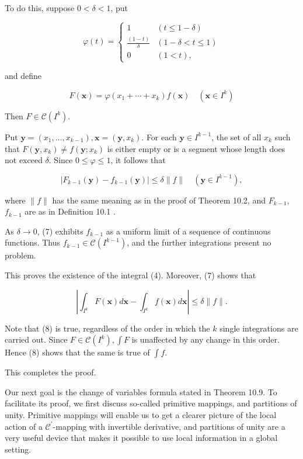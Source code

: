 \documentclass[10pt]{article}
\begin{document}
To do this, suppose $0<\delta<1$, put

$$
\varphi(t)= \begin{cases}1 & (t \leq 1-\delta) \\ \frac{(1-t)}{\delta} & (1-\delta<t \leq 1) \\ 0 & (1<t),\end{cases}
$$

and define

$$
F(\mathbf{x})=\varphi\left(x_{1}+\cdots+x_{k}\right) f(\mathbf{x}) \quad\left(\mathbf{x} \in I^{k}\right)
$$

Then $F \in \mathscr{C}\left(I^{k}\right)$.

Put $\mathbf{y}=\left(x_{1}, \ldots, x_{k-1}\right), \mathbf{x}=\left(\mathbf{y}, x_{k}\right)$. For each $\mathbf{y} \in I^{k-1}$, the set of all $x_{k}$ such that $F\left(\mathbf{y}, x_{k}\right) \neq f\left(\mathbf{y} ; x_{k}\right)$ is either empty or is a segment whose length does not exceed $\delta$. Since $0 \leq \varphi \leq 1$, it follows that

$$
\left|F_{k-1}(\mathbf{y})-f_{k-1}(\mathbf{y})\right| \leq \delta\|f\| \quad\left(\mathbf{y} \in I^{k-1}\right),
$$

where $\|f\|$ has the same meaning as in the proof of Theorem 10.2, and $F_{k-1}$, $f_{k-1}$ are as in Definition 10.1 .

As $\delta \rightarrow 0$, (7) exhibits $f_{k-1}$ as a uniform limit of a sequence of continuous functions. Thus $f_{k-1} \in \mathscr{C}\left(I^{k-1}\right)$, and the further integrations present no problem.

This proves the existence of the integral (4). Moreover, (7) shows that

$$
\left|\int_{I^{k}} F(\mathbf{x}) d \mathbf{x}-\int_{I^{k}} f(\mathbf{x}) d \mathbf{x}\right| \leq \delta\|f\| .
$$

Note that (8) is true, regardless of the order in which the $k$ single integrations are carried out. Since $F \in \mathscr{C}\left(I^{k}\right), \int F$ is unaffected by any change in this order. Hence (8) shows that the same is true of $\int f$.

This completes the proof.

Our next goal is the change of variables formula stated in Theorem 10.9. To facilitate its proof, we first discuss so-called primitive mappings, and partitions of unity. Primitive mappings will enable us to get a clearer picture of the local action of a $\mathscr{C}^{\prime}$-mapping with invertible derivative, and partitions of unity are a very useful device that makes it possible to use local information in a global setting.
\end{document}
